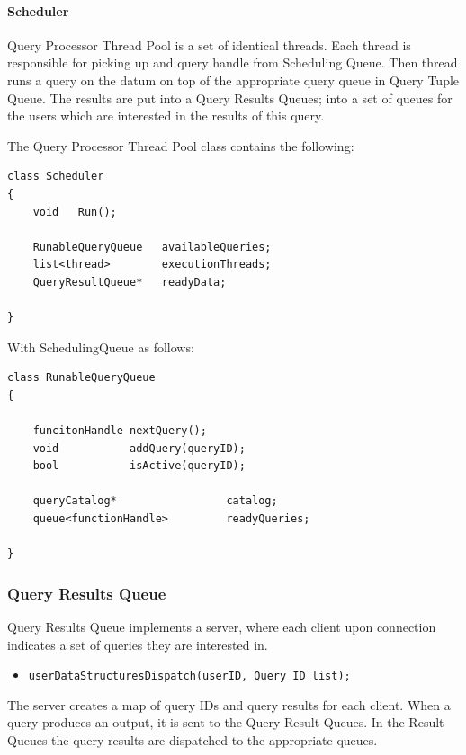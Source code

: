 \documentclass[11pt]{article}
\begin{document}
\paragraph{Scheduler}

Query Processor Thread Pool is a set of identical threads. Each thread is responsible for picking up and query handle from Scheduling Queue. Then thread runs a query on the datum on top of the appropriate query queue in Query Tuple Queue. The results are put into a Query Results Queues; into a set of queues for the users which are interested in the results of this query. 

The Query Processor Thread Pool class contains the following:

\begin{verbatim}
class Scheduler
{
    void   Run();

    RunableQueryQueue   availableQueries;
    list<thread>        executionThreads;
    QueryResultQueue*   readyData;
	
}
\end{verbatim}

\noindent With SchedulingQueue as follows:

\begin{verbatim}
class RunableQueryQueue
{
    
    funcitonHandle nextQuery();
    void           addQuery(queryID);
    bool           isActive(queryID);

    queryCatalog*                 catalog;
    queue<functionHandle>         readyQueries;
	
}
\end{verbatim}


\subsubsection{Query Results Queue}

Query Results Queue implements a server, where each client upon connection indicates a set of queries they are interested in.

\begin{itemize}
	\item {\tt userDataStructuresDispatch(userID, Query ID list);}
\end{itemize}

\noindent The server creates a map of query IDs and query results for each client. When a query produces an output, it is sent to the Query Result Queues. In the Result Queues the query results are dispatched to the appropriate queues.
\end{document}
